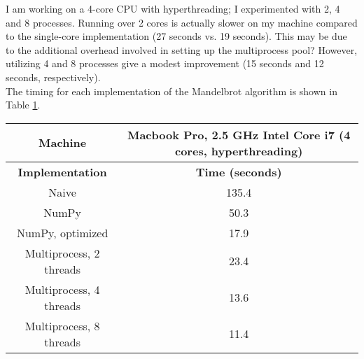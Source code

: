 \documentclass[paper=a4, fontsize=11pt]{scrartcl} %
\numberwithin{equation}{section} %
\numberwithin{figure}{section} %
\numberwithin{table}{section} %
\begin{document}
I am working on a 4-core CPU with hyperthreading; I experimented with 2, 4 and 8 processes. Running over 2 cores is actually slower on my machine compared to the single-core implementation (27 seconds vs. 19 seconds). This may be due to the additional overhead involved in setting up the multiprocess pool? However, utilizing 4 and 8 processes give a modest improvement (15 seconds and 12 seconds, respectively).\\ 

The timing for each implementation of the Mandelbrot algorithm is shown in Table \ref{tab:timing}.

\begin{table}\label{tab:timing}
	\begin{tabular}{c c}
		Machine & Macbook Pro, 2.5 GHz Intel Core i7 (4 cores, hyperthreading)\\
		\hline
		\textbf{Implementation} & \textbf{Time (seconds)}\\
		\hline
		Naive & 135.4 \\
		NumPy & 50.3 \\
		NumPy, optimized & 17.9 \\
		Multiprocess, 2 threads & 23.4 \\
		Multiprocess, 4 threads & 13.6 \\
		Multiprocess, 8 threads & 11.4 \\
		\hline		
	\end{tabular}
\end{table}
\end{document}
